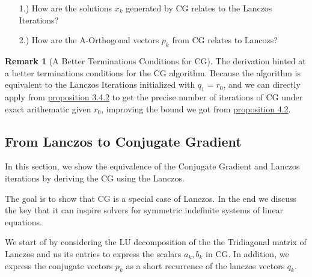 \documentclass[]{article}
\theoremstyle{definition}
\newtheorem{remark}{Remark}[subsection]
\begin{document}
            \begin{enumerate}
                \item [1.)] How are the solutions $x_k$ generated by CG relates to the Lanczos Iterations? 
                \item [2.)] How are the A-Orthogonal vectors $p_k$ from CG relates to Lancozs? 
            \end{enumerate}
            \begin{remark}[A Better Terminations Conditions for CG]
                The derivation hinted at a better terminations conditions for the CG algorithm. Because the algorithm is equivalent to the Lanczos Iterations initialized with $q_1 = r_0$, and we can directly apply from \hyperref[remark:Minimal_Polynomial_from_Lanczos_Iterations]{proposition 3.4.2} to get the precise number of iterations of CG under exact arithematic given $r_0$, improving the bound we got from \hyperref[prop:Termination_of_CG]{proposition 4.2}. 
            \end{remark}
    \subsection{From Lanczos to Conjugate Gradient}
            In this section, we show the equivalence of the Conjugate Gradient and Lanczos iterations by deriving the CG using the Lanczos. 
            \par
            The goal is to show that CG is a special case of Lanczos. In the end we discuss the key that it can inspire solvers for symmetric indefinite systems of linear equations. 
            \par
            We start of by considering the LU decomposition of the the Tridiagonal matrix of Lanczos and us its entries to express the scalars $a_k, b_k$ in CG. In addition, we express the conjugate vectors $p_k$ as a short recurrence of the lanczos vectors $q_k$. 
\end{document}
